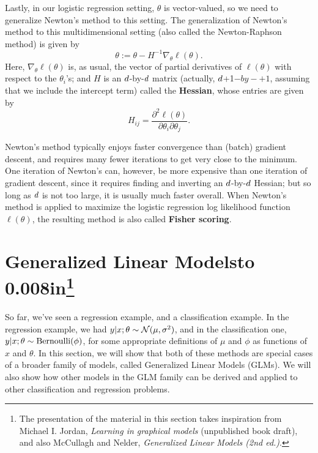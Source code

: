 \documentclass{article}
\begin{document}

Lastly, in our logistic regression setting, $\theta$ is vector-valued, so
we need to generalize Newton's method to this setting.  The generalization of
Newton's method to this multidimensional setting (also called the
Newton-Raphson method) is given by
\[
\theta := \theta - H^{-1} \nabla_\theta \ell(\theta).
\]
Here, $\nabla_\theta \ell(\theta)$ is, as usual, the vector of partial derivatives
of $\ell(\theta)$ with respect to the $\theta_i$'s; and $H$ is an ${d}$-by-${d}$
matrix (actually, ${d}$+1$-by-$\di$+1$, assuming that we include the intercept term)
called the {\bf Hessian}, whose entries are given by
\[
H_{ij} = \frac{\partial^2 \ell(\theta)}{\partial \theta_i \partial \theta_j}.
\]

Newton's method typically enjoys faster convergence than (batch) gradient
descent, and requires many fewer iterations to get very close to the
minimum.  One iteration of Newton's can, however, be more expensive than one
iteration of gradient descent, since it requires finding and
inverting an ${d}$-by-${d}$ Hessian; but so long as ${d}$ is not too large,
it is usually much faster overall.  When Newton's method is applied to maximize the
logistic regression log likelihood function $\ell(\theta)$, the resulting method
is also called {\bf Fisher scoring}.

\newpage
\part{Generalized Linear
  Models\hbox to 0.008in{}\protect\LARGE\protect\footnote{The presentation of the
material in this section takes inspiration from Michael I. Jordan, \emph{Learning
in graphical models} (unpublished book draft), and also McCullagh and Nelder,
\emph{Generalized Linear Models (2nd ed.)}.}
}

So far, we've seen a regression example, and a classification example.
In the regression example, we had $y|x;\theta \sim {\cal N}(\mu, \sigma^2)$, and
in the classification one, $y|x;\theta \sim {\rm Bernoulli}(\phi)$,
for some appropriate definitions of $\mu$ and $\phi$
as functions
of $x$ and $\theta$.  In this section, we will show that both of
these methods are special cases of  a broader family of models, called
Generalized Linear Models (GLMs).  We will also show how other models
in the GLM family can be derived and applied to other classification
and regression problems.
\end{document}
